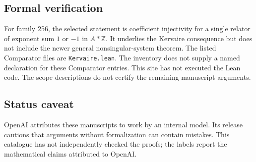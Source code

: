 \documentclass[11pt]{article}
\begin{document}
\subsection{Formal verification}
For family 256, the selected statement is coefficient injectivity for a single relator of exponent sum $1$ or $-1$ in $A*\mathbb Z$. It underlies the Kervaire consequence but does not include the newer general nonsingular-system theorem. The listed Comparator files are \texttt{Kervaire.lean}. The inventory does not supply a named declaration for these Comparator entries. This site has not executed the Lean code. The scope descriptions do not certify the remaining manuscript arguments.

\subsection{Status caveat}
OpenAI attributes these manuscripts to work by an internal model. Its release cautions that arguments without formalization can contain mistakes. This catalogue has not independently checked the proofs; the labels report the mathematical claims attributed to OpenAI.
\end{document}
